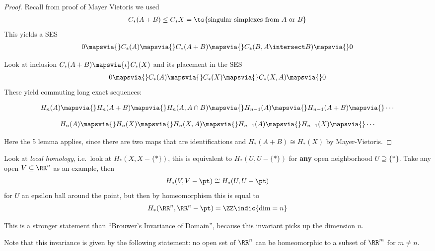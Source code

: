 \begin{proof}

Recall from proof of Mayer Vietoris we used
\begin{align*}
C_*(A+B) \leq C_* X = \ts{\text{singular simplexes from } A \text{ or } B}
\end{align*} This yields a SES
\begin{align*}
    0 \mapsvia{} C_*(A) \mapsvia{} C_*(A+B) \mapsvia{} C_*(B, A\intersect B)\mapsvia{} 0
    \end{align*}

Look at inclusion \(C_*(A+B) \mapsvia{\iota} C_*(X)\) and its placement
in the SES
\begin{align*}
0\mapsvia{} C_*(A) \mapsvia{} C_*(X) \mapsvia{} C_*(X,A)\mapsvia{} 0
\end{align*} These yield commuting long exact sequences:

\begin{align*}
H_n(A) \mapsvia{} H_n(A+B) \mapsvia{} H_n(A, A\cap B) \mapsvia{} H_{n-1}(A) \mapsvia{} H_{n-1}(A+B) \mapsvia{} \cdots
\end{align*}

\begin{align*}
H_n(A) \mapsvia{} H_n(X) \mapsvia{} H_n(X,A) \mapsvia{} H_{n-1}(A) \mapsvia{} H_{n-1}(X) \mapsvia{} \cdots
\end{align*}

Here the 5 lemma applies, since there are two maps that are
identifications and \(H_*(A+B) \cong H_*(X)\) by Mayer-Vietoris.

\end{proof}

\begin{example}

Look at \emph{local homology}, i.e.~look at \(H_*(X, X-\{*\})\), this is
equivalent to \(H_*(U, U-\{*\})\) for \textbf{any} open neighborhood
\(U\supseteq \{*\}\). Take any open \(V \subseteq \RR^n\) as an example,
then
\begin{align*}
H_*(V,V-\pt) \cong H_*(U, U-\pt)
\end{align*} for \(U\) an epsilon ball around the point, but then by
homeomorphism this is equal to
\begin{align*}
H_*(\RR^n, \RR^n - \pt) = \ZZ\indic{\text{dim} = n}
\end{align*}

\end{example}

\begin{remark}

This is a stronger statement than ``Brouwer's Invariance of Domain'',
because this invariant picks up the dimension \(n\).

Note that this invariance is given by the following statement: no open
set of \(\RR^n\) can be homeomorphic to a subset of \(\RR^m\) for
\(m\neq n\).

\end{remark}

